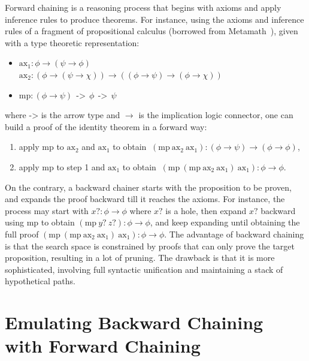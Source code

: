 \documentclass{easychair}
\newcommand{\arrowtype}{\ \ \text{->}\ \ }
\newcommand{\axon}{\text{ax}_1}
\newcommand{\axtw}{\text{ax}_2}
\newcommand{\axmp}{\text{mp}}
\begin{document}
Forward chaining is a reasoning process that begins with axioms and
apply inference rules to produce theorems.  For instance, using the
axioms and inference rules of a fragment of propositional calculus
(borrowed from Metamath~\cite{Metamath}), given with a type theoretic
representation:
\begin{itemize}
\item $\axon : \phi \to (\psi \to \phi)$ $\ \ \ \ \ \ \ \ \ \ \ \ \ \
  \ \ \ \ \ \ \ \ $ $\axtw : ( \phi \to ( \psi \to \chi ) ) \to ( ( \phi \to \psi ) \to ( \phi \to \chi ) )$
\item $\axmp : ( \phi \to \psi ) \arrowtype \phi \arrowtype \psi$
\end{itemize}
where $\text{->}$ is the arrow type and $\to$ is the implication logic
connector, one can build a proof of the identity theorem in a forward
way:
\begin{enumerate}
\item apply $\axmp$ to $\axtw$ and $\axon$ to obtain
  $\ (\axmp\ \axtw\ \axon) : ( \phi \to \psi) \to (\phi \to \phi)$,
\item apply $\axmp$ to step 1 and $\axon$ to obtain
  $\ (\axmp\ (\axmp\ \axtw\ \axon)\ \axon) : \phi \to \phi$.
\end{enumerate}
On the contrary, a backward chainer starts with the proposition to be
proven, and expands the proof backward till it reaches the axioms.
For instance, the process may start with $x? : \phi \to \phi$ where
$x?$ is a hole, then expand $x?$ backward using $\axmp$ to obtain
$(\axmp\ y?\ z?) : \phi \to \phi$, and keep expanding until obtaining
the full proof
$(\axmp\ (\axmp\ \axtw\ \axon)\ \axon) : \phi \to \phi$.  The
advantage of backward chaining is that the search space is constrained
by proofs that can only prove the target proposition, resulting in a
lot of pruning.  The drawback is that it is more sophisticated,
involving full syntactic unification and maintaining a stack of
hypothetical paths.

\section{Emulating Backward Chaining with Forward Chaining}
\end{document}

